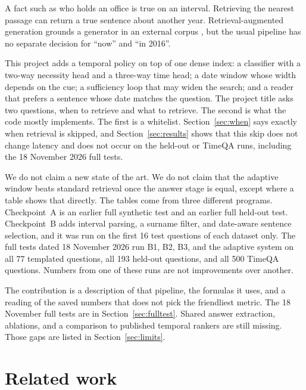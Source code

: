 \documentclass[11pt,letterpaper]{article}
\begin{document}
A fact such as who holds an office is true on an interval.
Retrieving the nearest passage can return a true sentence about another year.
Retrieval-augmented generation grounds a generator in an external corpus \cite{lewis2020rag}, but the usual pipeline has no separate decision for ``now'' and ``in 2016''.

This project adds a temporal policy on top of one dense index:
a classifier with a two-way necessity head and a three-way time head;
a date window whose width depends on the cue;
a sufficiency loop that may widen the search;
and a reader that prefers a sentence whose date matches the question.
The project title asks two questions, when to retrieve and what to retrieve.
The second is what the code mostly implements.
The first is a whitelist.
Section~\ref{sec:when} says exactly when retrieval is skipped, and Section~\ref{sec:results} shows that this skip does not change latency and does not occur on the held-out or TimeQA runs, including the 18 November 2026 full tests.

We do not claim a new state of the art.
We do not claim that the adaptive window beats standard retrieval once the answer stage is equal, except where a table shows that directly.
The tables come from three different programs.
Checkpoint~A is an earlier full synthetic test and an earlier full held-out test.
Checkpoint~B adds interval parsing, a surname filter, and date-aware sentence selection, and it was run on the first 16 test questions of each dataset only.
The full tests dated 18 November 2026 run B1, B2, B3, and the adaptive system on all 77 templated questions, all 193 held-out questions, and all 500 TimeQA questions.
Numbers from one of these runs are not improvements over another.

The contribution is a description of that pipeline, the formulas it uses, and a reading of the saved numbers that does not pick the friendliest metric.
The 18 November full tests are in Section~\ref{sec:fulltest}.
Shared answer extraction, ablations, and a comparison to published temporal rankers are still missing.
Those gaps are listed in Section~\ref{sec:limits}.

\section{Related work}
\label{sec:related}
\end{document}
